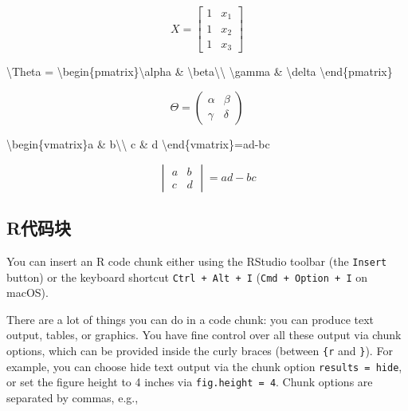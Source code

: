 \documentclass[]{article}
\newenvironment{Shaded}{\begin{snugshade}}{\end{snugshade}}
\newcommand{\SpecialCharTok}[1]{\textcolor[rgb]{0.00,0.00,0.00}{#1}}
\newcommand{\SpecialStringTok}[1]{\textcolor[rgb]{0.31,0.60,0.02}{#1}}
\begin{document}
\[X = \begin{bmatrix}1 & x_{1}\\
1 & x_{2}\\
1 & x_{3}
\end{bmatrix}\]

\begin{Shaded}
\begin{Highlighting}[]
\SpecialStringTok{$$}\SpecialCharTok{\textbackslash{}Theta}\SpecialStringTok{ = }\SpecialCharTok{\textbackslash{}begin}\SpecialStringTok{\{pmatrix\}}\SpecialCharTok{\textbackslash{}alpha}\SpecialStringTok{ & }\SpecialCharTok{\textbackslash{}beta\textbackslash{}\textbackslash{}}
\SpecialCharTok{\textbackslash{}gamma}\SpecialStringTok{ & }\SpecialCharTok{\textbackslash{}delta}
\SpecialCharTok{\textbackslash{}end}\SpecialStringTok{\{pmatrix\}$$}
\end{Highlighting}
\end{Shaded}

\[\Theta = \begin{pmatrix}\alpha & \beta\\
\gamma & \delta
\end{pmatrix}\]

\begin{Shaded}
\begin{Highlighting}[]
\SpecialStringTok{$$}\SpecialCharTok{\textbackslash{}begin}\SpecialStringTok{\{vmatrix\}a & b}\SpecialCharTok{\textbackslash{}\textbackslash{}}
\SpecialStringTok{c & d}
\SpecialCharTok{\textbackslash{}end}\SpecialStringTok{\{vmatrix\}=ad-bc$$}
\end{Highlighting}
\end{Shaded}

\[\begin{vmatrix}a & b\\
c & d
\end{vmatrix}=ad-bc\]

\hypertarget{r}{%
\subsection{R代码块}\label{r}}

You can insert an R code chunk either using the RStudio toolbar (the
\texttt{Insert} button) or the keyboard shortcut
\texttt{Ctrl\ +\ Alt\ +\ I} (\texttt{Cmd\ +\ Option\ +\ I} on macOS).

There are a lot of things you can do in a code chunk: you can produce
text output, tables, or graphics. You have fine control over all these
output via chunk options, which can be provided inside the curly braces
(between \texttt{\textasciigrave{}\textasciigrave{}\textasciigrave{}\{r}
and \texttt{\}}). For example, you can choose hide text output via the
chunk option
\texttt{results\ =\ \textquotesingle{}hide\textquotesingle{}}, or set
the figure height to 4 inches via \texttt{fig.height\ =\ 4}. Chunk
options are separated by commas, e.g.,
\end{document}
